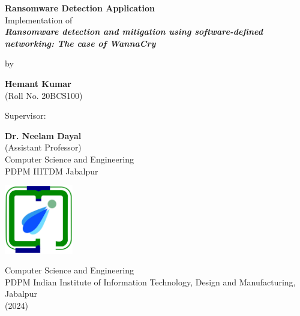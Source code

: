 \documentclass[12pt,letterpaper]{article}
\begin{document}
\begin{titlepage}
    \begin{center}
        \vspace*{1cm}
        
        \textbf{\LARGE Ransomware Detection Application} \\
        \Large{Implementation of \\ \textbf{\textit{Ransomware detection and mitigation using software-defined networking: The case of WannaCry}}}
        
        \vspace{0.6cm}
        
        \Large by
        
        \textbf{\Large Hemant Kumar} \\
        (Roll No. 20BCS100)
        
        \vspace{1cm}
        
        \Large Supervisor:
        
        \textbf{\Large Dr. Neelam Dayal }\\
            (Assistant Professor) \\
        Computer Science and Engineering \\
        PDPM IIITDM Jabalpur
        
        \vspace{1cm}
        
        
        
        \vfill
        
        \includegraphics[width=30mm]{images/logo_college copy.png}
        
        \vspace{0.5cm}
        
        \Large{Computer Science and Engineering 
        \\ PDPM Indian Institute of Information Technology, Design and Manufacturing, Jabalpur}
        \\ (2024)
        
    \end{center}
\end{titlepage}
\end{document}
